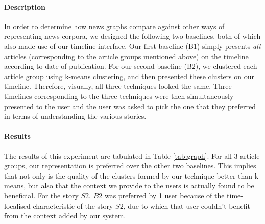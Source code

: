 \normalsize

\paragraph*{Description} In order to determine how news graphs compare against other ways of representing news corpora, we designed the following two baselines, both of which also made use of our timeline interface. Our first baseline (B1) simply presents \emph{all} articles (corresponding to the article groups mentioned above) on the timeline according to date of publication. For our second baseline (B2), we clustered each article group using k-means clustering, and then presented these clusters on our timeline. Therefore, visually, all three techniques looked the same. Three timelines corresponding to the three techniques were then simultaneously presented to the user and the user was asked to pick the one that they preferred in terms of understanding the various stories.

\paragraph*{Results} The results of this experiment are tabulated in Table \ref{tab:graph}. For all 3 article groups, our representation is preferred over the other two baselines. This implies that not only is the quality of the clusters formed by our technique better than k-means, but also that the context we provide to the users is actually found to be beneficial. For the story $S2$, $B2$ was preferred by 1 user because of the time-localised characteristic of the story $S2$, due to which that user couldn't benefit from the context added by our system.



